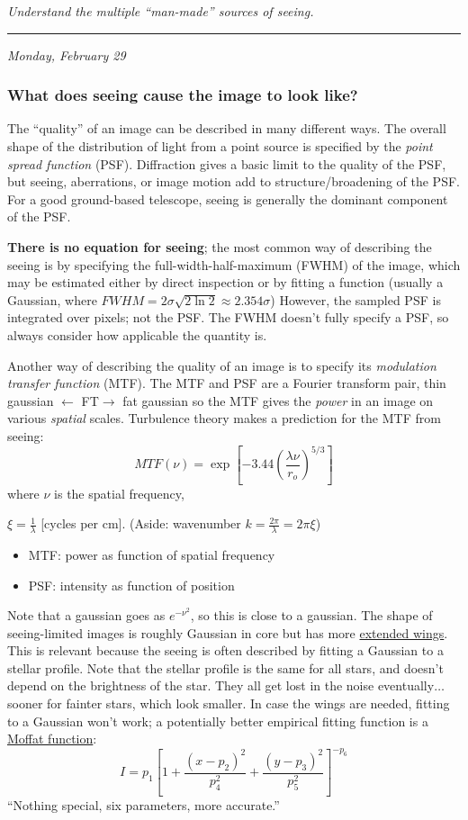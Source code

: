 \documentclass[12pt]{article}
\newcommand{\mynotes}[1]{\textcolor{myBlue}{#1}}
\newcommand{\test}[1]{%
    \begin{center}
        {\parbox{0.9\textwidth}{\textit{\small#1}}}
    \end{center}}
\newcommand{\mydate}[1]{
    \begin{flushright}
        \rule{\textwidth}{0.4pt} %
        \small\hfill\textit{#1}
    \end{flushright}}
\begin{document}
\test{Understand the multiple ``man-made'' sources of seeing.}

\mydate{Monday, February 29}
\subsubsection{What does seeing cause the image to look like?}
The ``quality'' of an image can be described in many different ways.
The overall shape of the distribution of light from a point source is
specified by the \textit{point spread function} (PSF). Diffraction gives a basic
limit to the quality of the PSF, but seeing, aberrations, or image
motion add to structure/broadening of the PSF\@. For a good ground-based
telescope, seeing is generally the dominant component of the PSF.

\textbf{There is no equation for seeing};
the most common way of describing the seeing is by specifying the
full-width-half-maximum (FWHM) of the image, which may be estimated either by
direct inspection or by fitting a function (usually a Gaussian, where $FWHM =
2\sigma\sqrt{2\ln{2}} \approx 2.354\sigma$) However, the sampled PSF is
integrated over pixels; not the PSF\@. The FWHM doesn't fully specify a PSF, so
always consider how applicable the quantity is.

Another way of describing the quality of an image is to specify its
\textit{modulation transfer function} (MTF). The MTF and PSF are a Fourier
transform pair, \mynotes{thin gaussian $\leftarrow$\small
FT\normalsize$\rightarrow$ fat gaussian} so the MTF gives the \textit{power} in
an image on various \textit{spatial} scales. Turbulence theory makes a
prediction for the MTF from
seeing:
\[
    MTF(\nu)
    = \exp \left[ -3.44 \left( \frac{\lambda\nu}{r_{o}} \right) ^{5/3} \right]
    \]
where $\nu$ is the spatial frequency,
\mynotes{$\xi = \frac{1}{\lambda}$ [cycles per cm].
(Aside: wavenumber $k = \frac{2\pi}{\lambda} = 2\pi\xi$)
\begin{itemize}
    \item MTF: power as function of spatial frequency
    \item PSF: intensity as function of position
\end{itemize}}

Note that a gaussian goes as $e^{-\nu^{2}}$, so this is close to a gaussian.
The shape of seeing-limited images is roughly Gaussian in core but has more \href{http://astronomy.nmsu.edu/holtz/a535/html/diagrams/a535/racine2.htm}
{extended wings}. This is relevant because the seeing
is often described by fitting a Gaussian to a stellar profile. \mynotes{Note
that the stellar profile is the same for all stars, and doesn't depend on the
brightness of the star. They all get lost in the noise eventually$\ldots$
sooner for fainter stars, which look smaller. In case the wings are needed,
fitting to a Gaussian won't work;} a potentially better empirical fitting
function is a \href{http://astronomy.nmsu.edu/holtz/a535/html/diagrams/a535/racine3.htm}
{Moffat function}:
\[
    I = p_{1} \left[
        1 + \frac{ \left( x-p_{2} \right) ^{2}}{p_{4}^{2}} +
        \frac{ \left( y-p_{3} \right) ^{2}}{p_{5}^{2}} \right] ^{-p_{6}}
    \]
``Nothing special, six parameters, more accurate.''
\end{document}
